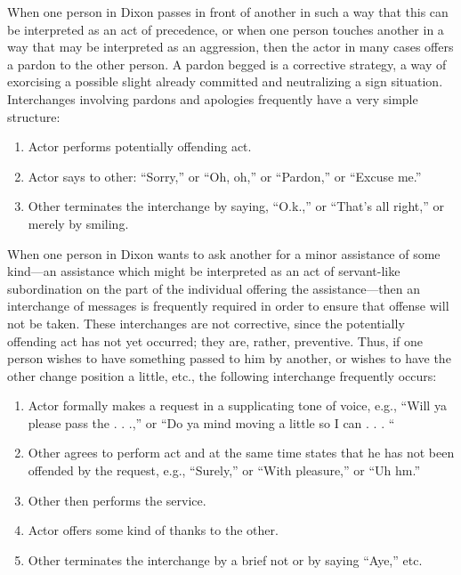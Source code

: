 \documentclass[openany,nobib]{tufte-book}
\begin{document}
When one person in Dixon passes in front of another in such a way that
this can be interpreted as an act of precedence, or when one person
touches another in a way that may be interpreted as an aggression, then
the actor in many cases offers a pardon to the other person. A pardon
begged is a corrective strategy, a way of exorcising a possible slight
already committed and neutralizing a sign situation. Interchanges
involving pardons and apologies frequently have a very simple structure:

\begin{enumerate}
\item
  Actor performs potentially offending act.
\item
  Actor says to other: ``Sorry,'' or ``Oh, oh,'' or ``Pardon,'' or
  ``Excuse me.''
\item
  Other terminates the interchange by saying, ``O.k.,'' or ``That's all
  right,'' or merely by smiling.
\end{enumerate}

When one person in Dixon wants to ask another for a minor assistance of
some kind---an assistance which might be interpreted as an act of
servant-like subordination on the part of the individual offering the
assistance---then an interchange of messages is frequently required in
order to ensure that offense will not be taken. These interchanges are
not corrective, since the potentially offending act has not yet
occurred; they are, rather, preventive. Thus, if one person wishes to
have something passed to him by another, or wishes to have the other
change position a little, etc., the following interchange frequently
occurs:

\begin{enumerate}
\item
  Actor formally makes a request in a supplicating tone of voice, e.g.,
  ``Will ya please pass the . . .,'' or ``Do ya mind moving a little so
  I can . . . ``
\item
  Other agrees to perform act and at the same time states that he has
  not been offended by the request, e.g., ``Surely,'' or ``With
  pleasure,'' or ``Uh hm.''
\item
  Other then performs the service.
\item
  Actor offers some kind of thanks to the other.
\item
  Other terminates the interchange by a brief not or by saying ``Aye,''
  etc.
\end{enumerate}
\end{document}
